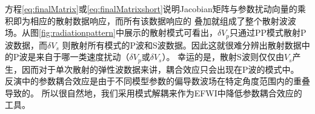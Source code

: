 方程\eqref{eq:finalMatrix}或\eqref{eq:finalMatrixshort}说明Jacobian矩阵与参数扰动向量的乘积即为相应的散射数据响应，而所有该数据响应的
叠加就组成了整个散射波波场。从图\ref{fig:radiationpattern}中展示的散射模式可看出，$\delta V_p$只通过PP模式散射P波数据，而$\delta V_s$
则散射所有模式的P波和S波数据。因此这就很难分辨出散射数据中的P波是来自于哪一类速度扰动（$\delta V_p$或$\delta V_s$）。
幸运的是，散射S波则仅仅由$V_s$产生，因而对于单次散射的弹性波数据来讲，耦合效应只会出现在P波的模式中。
反演中的参数耦合效应是由于不同模型参数的偏导数波场在特定角度范围内的重叠导致的\cite{tarantola:1986,operto2013guided}。
所以很自然地，我们采用模式解耦来作为EFWI中降低参数耦合效应的工具。
\begin{figure}
    \begin{center}
        \\

\end{center}
\end{figure}
